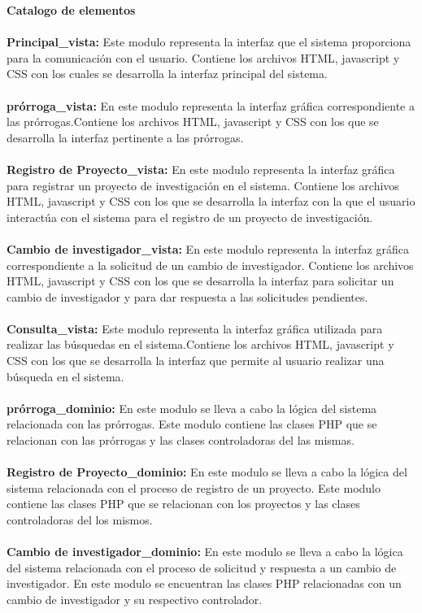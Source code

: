 \documentclass[12pt,oneside,letterpaper]{report}
\begin{document}
\textbf{Catalogo de elementos}\\
\\
\textbf{Principal\_vista:} Este modulo representa la interfaz que el sistema proporciona para la comunicación con el usuario. Contiene los archivos HTML,  javascript y CSS con los cuales se desarrolla la interfaz principal del sistema.\\
\\
\textbf{prórroga\_vista:} En este modulo representa la interfaz gráfica correspondiente a las prórrogas.Contiene los archivos HTML, javascript y CSS con los que se desarrolla la interfaz pertinente a las prórrogas.\\
\\
\textbf{Registro de Proyecto\_vista:} En este modulo representa la interfaz gráfica para registrar un proyecto de investigación en el sistema. Contiene los archivos HTML, javascript y CSS con los que se desarrolla la interfaz con la que el usuario interactúa con el sistema para el registro de un proyecto de investigación.\\
\\
\textbf{Cambio de investigador\_vista:} En este modulo representa la interfaz gráfica correspondiente a la solicitud de un cambio de investigador. Contiene los archivos HTML, javascript y CSS con los que se desarrolla la interfaz para solicitar un cambio de investigador y para dar respuesta a las solicitudes pendientes.\\
\\
\textbf{Consulta\_vista:} Este modulo  representa la interfaz gráfica utilizada para realizar las búsquedas en el sistema.Contiene los archivos HTML, javascript y CSS con los que se desarrolla la interfaz que permite al usuario realizar una búsqueda en el sistema.\\
\\
\textbf{prórroga\_dominio:} En este modulo se lleva a cabo la lógica del sistema relacionada con las prórrogas. Este modulo contiene las clases PHP que se relacionan con las prórrogas y las clases controladoras del las mismas.\\
\\
\textbf{Registro de Proyecto\_dominio:} En este modulo se lleva a cabo la lógica del sistema relacionada con el proceso de registro de un proyecto. Este modulo contiene las clases PHP que se relacionan con los proyectos y las clases controladoras del los mismos.\\
\\
\textbf{Cambio de investigador\_dominio:} En este modulo se lleva a cabo la lógica del sistema relacionada con el proceso de solicitud y respuesta a un cambio de investigador. En este modulo se encuentran las clases PHP relacionadas con un cambio de investigador y su respectivo controlador.\\
\end{document}
